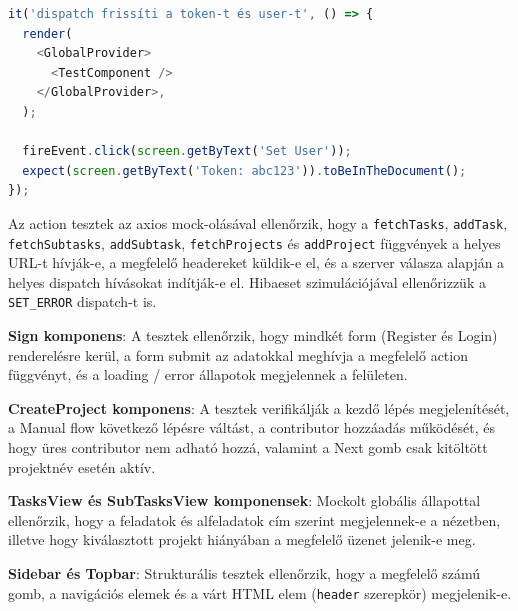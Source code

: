 \begin{lstlisting}[language=JavaScript, caption={GlobalContext integrációs teszt}]
it('dispatch frissíti a token-t és user-t', () => {
  render(
    <GlobalProvider>
      <TestComponent />
    </GlobalProvider>,
  );

  fireEvent.click(screen.getByText('Set User'));
  expect(screen.getByText('Token: abc123')).toBeInTheDocument();
});
\end{lstlisting}


Az action tesztek az axios mock-olásával ellenőrzik, hogy a \texttt{fetchTasks}, \texttt{addTask}, \texttt{fetchSubtasks}, \texttt{addSubtask}, \texttt{fetchProjects} és \texttt{addProject} függvények a helyes URL-t hívják-e, a megfelelő headereket küldik-e el, és a szerver válasza alapján a helyes dispatch hívásokat indítják-e el. Hibaeset szimulációjával ellenőrizzük a \texttt{SET\_ERROR} dispatch-t is.


\textbf{Sign komponens}: A tesztek ellenőrzik, hogy mindkét form (Register és Login) renderelésre kerül, a form submit az adatokkal meghívja a megfelelő action függvényt, és a loading / error állapotok megjelennek a felületen.

\textbf{CreateProject komponens}: A tesztek verifikálják a kezdő lépés megjelenítését, a Manual flow következő lépésre váltást, a contributor hozzáadás működését, és hogy üres contributor nem adható hozzá, valamint a Next gomb csak kitöltött projektnév esetén aktív.

\textbf{TasksView és SubTasksView komponensek}: Mockolt globális állapottal ellenőrzik, hogy a feladatok és alfeladatok cím szerint megjelennek-e a nézetben, illetve hogy kiválasztott projekt hiányában a megfelelő üzenet jelenik-e meg.

\textbf{Sidebar és Topbar}: Strukturális tesztek ellenőrzik, hogy a megfelelő számú gomb, a navigációs elemek és a várt HTML elem (\texttt{header} szerepkör) megjelenik-e.

